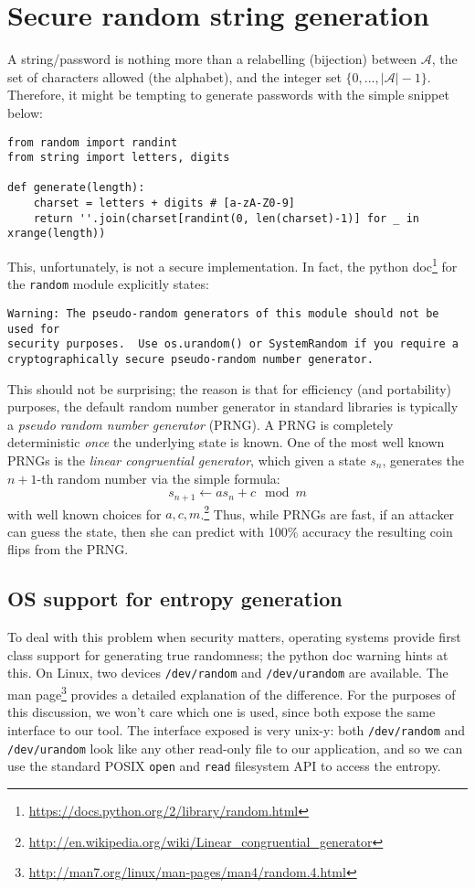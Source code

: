 \documentclass[10pt]{article}
\newcommand{\A}{\mathcal{A}}
\newcommand{\abs}[1]{\left| #1 \right|}
\begin{document}
\section{Secure random string generation}
A string/password is nothing more than a relabelling (bijection) between $\A$,
the set of characters allowed (the alphabet), and the integer set $\{0, ...,
\abs{\A}-1\}$. Therefore, it might be tempting to generate passwords with the 
simple snippet below:
\begin{verbatim}
from random import randint
from string import letters, digits

def generate(length):
    charset = letters + digits # [a-zA-Z0-9]
    return ''.join(charset[randint(0, len(charset)-1)] for _ in xrange(length))
\end{verbatim}
This, unfortunately, is not a secure implementation. In fact, the python
doc\footnote{\url{https://docs.python.org/2/library/random.html}} for the
\verb|random| module explicitly states:
\begin{verbatim}
Warning: The pseudo-random generators of this module should not be used for
security purposes.  Use os.urandom() or SystemRandom if you require a
cryptographically secure pseudo-random number generator.
\end{verbatim}
This should not be surprising; the reason is that for efficiency (and
portability) purposes, the default random number generator in standard
libraries is typically a \emph{pseudo random number generator} (PRNG).  A PRNG
is completely deterministic \emph{once} the underlying state is known.  One of
the most well known PRNGs is the \emph{linear congruential generator}, which
given a state $s_n$, generates the $n+1$-th random number via the simple formula:
\begin{equation*}
  s_{n+1} \gets a s_n + c \mod{m}
\end{equation*}
with well known choices for $a, c,
m$.\footnote{\url{http://en.wikipedia.org/wiki/Linear_congruential_generator}}
Thus, while PRNGs are fast, if an attacker can guess the state, then she can
predict with 100\% accuracy the resulting coin flips from the PRNG.

\subsection{OS support for entropy generation} To deal with this problem when
security matters, operating systems provide first class support for generating
true randomness; the python doc warning hints at this. On Linux, two devices
\texttt{/dev/random} and \texttt{/dev/urandom} are available. The man
page\footnote{\url{http://man7.org/linux/man-pages/man4/random.4.html}}
provides a detailed explanation of the difference. For the purposes of this
discussion, we won't care which one is used, since both expose the same
interface to our tool. The interface exposed is very unix-y: both
\texttt{/dev/random} and \texttt{/dev/urandom} look like any other read-only
file to our application, and so we can use the standard POSIX \verb|open| and
\verb|read| filesystem API to access the entropy.
\end{document}
